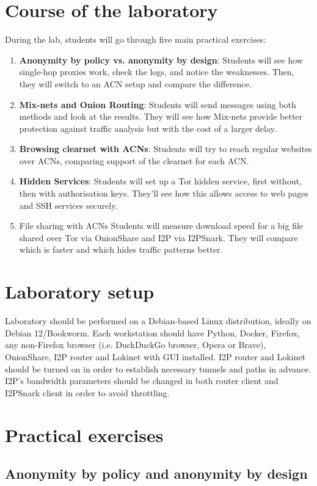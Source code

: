 \section{Course of the laboratory}
During the lab, students will go through five main practical exercises:
\begin{enumerate}
    \item \textbf{Anonymity by policy vs. anonymity by design}: Students will see how single-hop proxies work, check the logs, and notice the weaknesses. Then, they will switch to an ACN setup and compare the difference.
\item \textbf{Mix-nets and Onion Routing}: Students will send messages using both methods and look at the results. They will see how Mix-nets provide better protection against traffic analysis but with the cost of a larger delay.
\item \textbf{Browsing clearnet with ACNs}: Students will try to reach regular websites over ACNs, comparing support of the clearnet for each ACN.
\item \textbf{Hidden Services}: Students will set up a Tor hidden service, first without, then with authorisation keys. They’ll see how this allows access to web pages and SSH services securely.
\item File sharing with ACNs
Students will measure download speed for a big file shared over Tor via OnionShare and I2P via I2PSnark. They will compare which is faster and which hides traffic patterns better.
\end{enumerate}

\section{Laboratory setup}
Laboratory should be performed on a Debian-based Linux distribution, ideally on Debian 12/Bookworm. Each workstation should have Python, Docker, Firefox, any non-Firefox browser (i.e. DuckDuckGo browser, Opera or Brave), OnionShare, I2P router and Lokinet with GUI installed. I2P router and Lokinet should be turned on in order to establish necessary tunnels and paths in advance. I2P's bandwidth parameters should be changed in both router client and I2PSnark client in order to avoid throttling.

\section{Practical exercises}

\subsection{Anonymity by policy and anonymity by design}

